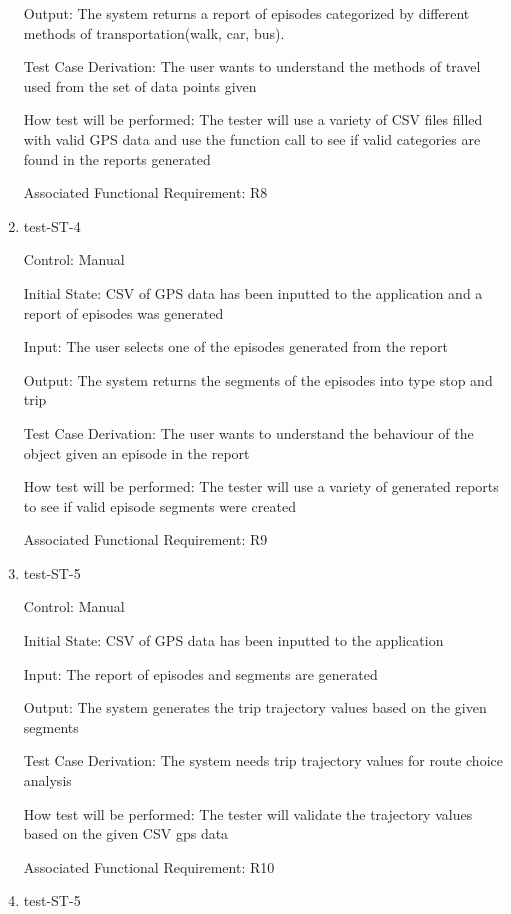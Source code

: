 \documentclass[12pt, titlepage]{article}
\begin{document}
\begin{enumerate}
Output: The system returns a report of episodes categorized by different  methods of transportation(walk, car, bus).

Test Case Derivation: The user wants to understand the methods of travel used from the set of data points given

How test will be performed: The tester will use a variety of CSV files filled with valid GPS data and use the function call to see if valid categories are found in the reports generated


Associated Functional Requirement: R8


\item{test-ST-4\\}

Control: Manual
					
Initial State: CSV of GPS data has been inputted to the application and a report of episodes was generated 
					
Input: The user selects one of the episodes generated from the report
					
Output: The system returns the segments of the episodes into type stop and trip 

Test Case Derivation: The user wants to understand the behaviour of the object given an episode in the report

How test will be performed: The tester will use a variety of generated reports to see if valid episode segments were created 


Associated Functional Requirement: R9


\item{test-ST-5\\}

Control: Manual
					
Initial State: CSV of GPS data has been inputted to the application 
					
Input: The report of episodes and segments are generated
					
Output: The system generates the trip trajectory values based on the given segments

Test Case Derivation: The system needs trip trajectory values for route choice analysis

How test will be performed: The tester will validate the trajectory values based on the given CSV gps data 

Associated Functional Requirement: R10

\item{test-ST-5\\}


\end{enumerate}
\end{document}
